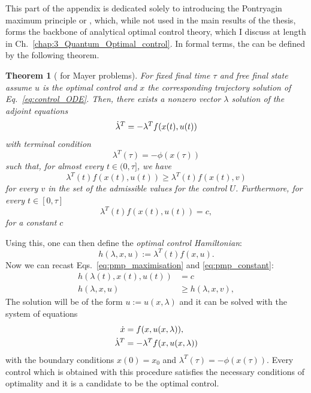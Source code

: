This part of the appendix is dedicated solely to introducing the Pontryagin maximum principle or , which, while not used in the main results of the thesis, forms the backbone of analytical optimal control theory, which I discuss at length in Ch.~\ref{chap:3_Quantum_Optimal_control}. In formal terms, the  can be defined \cite{dalessandro_introduction_2021} by the following theorem.

\newtheorem{theorem}{Theorem}

\begin{theorem}[ for Mayer problems]\label{thm:pmp}
    For fixed final time $\tau$ and free final state assume $u$ is the optimal control and $x$ the corresponding trajectory solution of Eq.~\eqref{eq:control_ODE}. Then, there exists a nonzero vector $\lambda$ solution of the adjoint equations
  \begin{equation}
      \dot{\lambda}^T = - \lambda^T f(x(t), u(t))
  \end{equation}
  with terminal condition
  \begin{equation}
      \lambda^T(\tau) = -\phi(x(\tau))
  \end{equation}
  such that, for almost every $t \in (0, \tau]$, we have
  \begin{equation}\label{eq:pmp_maximisation}
      \lambda^T(t) f(x(t), u(t)) \geq \lambda^T(t) f(x(t), v)
  \end{equation}
  for every $v$ in the set of the admissible values for the control $U$. Furthermore, for every $t \in [0, \tau]$
  \begin{equation}\label{eq:pmp_constant}
      \lambda^T(t) f(x(t), u(t)) = c,
  \end{equation}
  for a constant $c$
\end{theorem}

Using this, one can then define the \emph{optimal control Hamiltonian}:
\begin{equation}
    h(\lambda, x, u) := \lambda^T(t) f(x, u).
\end{equation}
Now we can recast Eqs.~\eqref{eq:pmp_maximisation} and \eqref{eq:pmp_constant}:
\begin{equation}
    \begin{aligned}
        h(\lambda(t), x(t), u(t)) &= c \\
        h(\lambda, x, u) &\geq h(\lambda, x, v),
    \end{aligned}
\end{equation}
The solution will be of the form $u := u(x, \lambda)$ and it can be solved with the system of equations
\begin{equation}
    \begin{aligned}
        \dot{x} &= f(x, u(x, \lambda)), \\
        \dot{\lambda}^T &= -\lambda^T f(x, u(x, \lambda))
    \end{aligned}
\end{equation}
with the boundary conditions $x(0) = x_0$ and $\lambda^T(\tau) = -\phi(x(\tau))$. Every control which is obtained with this procedure satisfies the necessary conditions of optimality and it is a candidate to be the optimal control.

